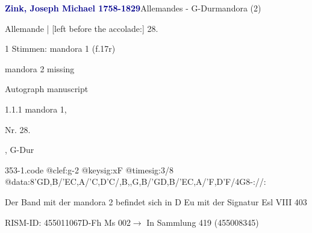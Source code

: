 \documentclass[twocolumn]{book}
\begin{document}
\par \vspace{7pt} \textcolor{darkblue}{\textbf{Zink, Joseph Michael  1758-1829}}\hfillplus{\textbf{[353]}}\newline Allemandes - G-Dur\newline mandora (2)
\par \begin{itshape}[f.17r, at left:] Allemande | [left before the accolade:] 28.\end{itshape} 
\par \textcolor{darkblue}{}  1 Stimmen: mandora 1  (f.17r)\newline \begin{small} mandora 2 missing\end{small} \newline Autograph manuscript
\par 1.1.1  mandora 1, \begin{itshape}Nr. 28.\end{itshape}, G-Dur  
\begin{filecontents*}{353-1.code}
@clef:g-2
@keysig:xF
@timesig:3/8
@data:8'GD,B/'EC,A/'C,D'C/,B,,G,B/'GD,B/'EC,A/'F,D'F/4G8-://:
\end{filecontents*}
\newline
%
\par Der Band mit der mandora 2 befindet sich in D Eu mit der Signatur Esl VIII 403
\par RISM-ID: 455011067\newline D-Fh  Ms 002\newline $\rightarrow$ In Sammlung 419 (455008345)
      
\end{document}
